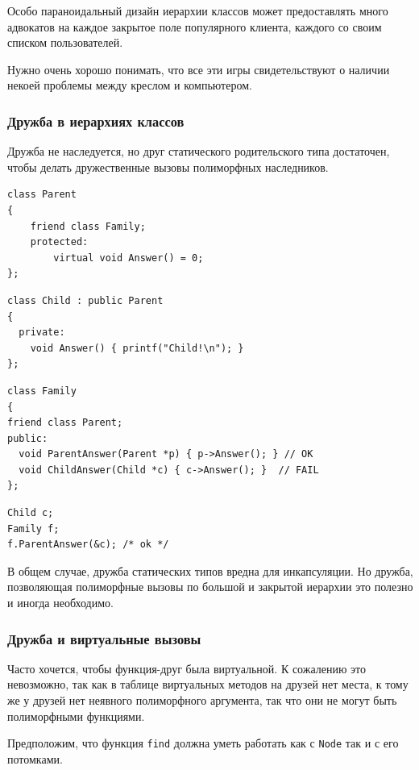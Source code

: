 \documentclass[a4paper,12pt,oneside]{article}
\begin{document}
Особо параноидальный дизайн иерархии классов может предоставлять много адвокатов на каждое закрытое поле популярного клиента, каждого со своим списком пользователей.

Нужно очень хорошо понимать, что все эти игры свидетельствуют о наличии некоей проблемы между креслом и компьютером.

\subsubsection{Дружба в иерархиях классов}

Дружба не наследуется, но друг статического родительского типа достаточен, чтобы делать дружественные вызовы полиморфных наследников.

\begin{lstlisting}
class Parent
{
    friend class Family;
    protected:
        virtual void Answer() = 0;
};
\end{lstlisting}

\begin{lstlisting}
class Child : public Parent
{
  private:
    void Answer() { printf("Child!\n"); }
};
\end{lstlisting}

\begin{lstlisting}
class Family
{
friend class Parent;
public:
  void ParentAnswer(Parent *p) { p->Answer(); } // OK
  void ChildAnswer(Child *c) { c->Answer(); }  // FAIL
};
\end{lstlisting}

\begin{lstlisting}
Child c;
Family f;
f.ParentAnswer(&c); /* ok */
\end{lstlisting}

В общем случае, дружба статических типов вредна для инкапсуляции. Но дружба, позволяющая полиморфные вызовы по большой и закрытой иерархии это полезно и иногда необходимо. 

\subsubsection{Дружба и виртуальные вызовы}

Часто хочется, чтобы функция-друг была виртуальной. К сожалению это невозможно, так как в таблице виртуальных методов на друзей нет места, к тому же у друзей нет неявного полиморфного аргумента, так что они не могут быть полиморфными функциями.

Предположим, что функция \lstinline!find! должна уметь работать как с \lstinline!Node! так и с его потомками.
\end{document}
